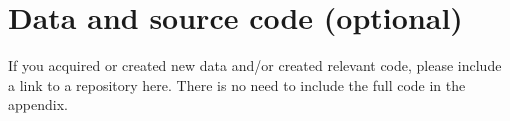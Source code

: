 \chapter{Data and source code (optional)}\label{data_and_source_code}
If you acquired or created new data and/or created relevant code, please include a link to a repository here. There is no need to include the full code in the appendix.